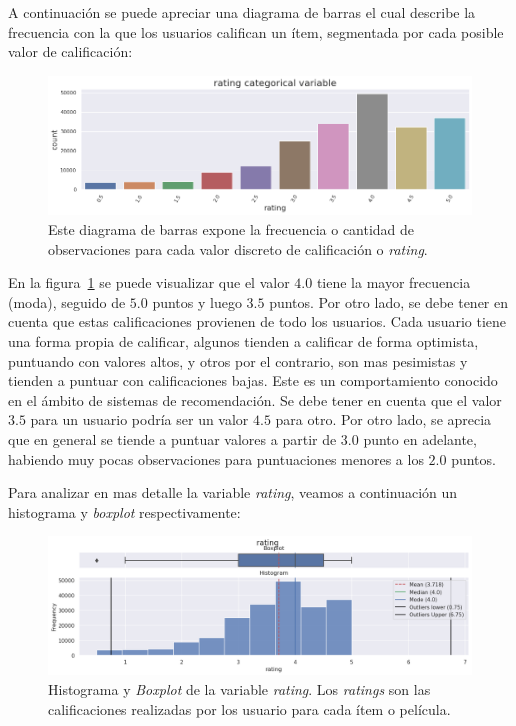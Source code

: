 \documentclass[11pt,a4paper,twoside]{thesis}
\begin{document}
A continuación se puede apreciar una diagrama de barras el cual describe la
frecuencia con la que los usuarios califican un ítem, segmentada por cada
posible valor de calificación:

\begin{figure}[h!]
	\centering
	\includegraphics[width=15cm]{./images/rating-barplot.png}
	\caption{Este diagrama de barras expone la frecuencia o cantidad de observaciones para cada valor discreto de calificación o \textit{rating}.}
	\label{fig:ratingsBarPlot}
\end{figure}

En la figura~\ref{fig:ratingsBarPlot} se puede visualizar que el valor $4.0$
tiene la mayor frecuencia (moda), seguido de $5.0$ puntos y luego $3.5$ puntos.
Por otro lado, se debe tener en cuenta que estas calificaciones provienen de
todo los usuarios. Cada usuario tiene una forma propia de calificar, algunos
tienden a calificar de forma optimista, puntuando con valores altos, y otros
por el contrario, son mas pesimistas y tienden a puntuar con calificaciones
bajas. Este es un comportamiento conocido en el ámbito de sistemas de
recomendación. Se debe tener en cuenta que el valor $3.5$ para un usuario
podría ser un valor $4.5$ para otro. Por otro lado, se aprecia que en general
se tiende a puntuar valores a partir de $3.0$ punto en adelante, habiendo muy
pocas observaciones para puntuaciones menores a los $2.0$ puntos.

\clearpage

Para analizar en mas detalle la variable \textit{rating}, veamos a continuación
un histograma y \textit{boxplot} respectivamente:

\begin{figure}[h!]
	\centering
	\includegraphics[width=15cm]{./images/rating-boxplot-histplot.png}
	\caption{Histograma y \textit{Boxplot} de la variable \textit{rating}. Los \textit{ratings} son las calificaciones realizadas por los usuario para cada ítem o película.}
	\label{fig:ratingsHistPlot}
\end{figure}
\end{document}

